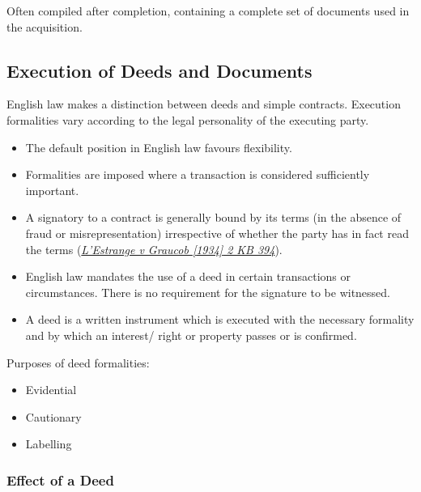 \documentclass[
]{article}
\providecommand{\tightlist}{%
  \setlength{\itemsep}{0pt}\setlength{\parskip}{0pt}}
\begin{document}
Often compiled after completion, containing a complete set of documents
used in the acquisition.

\hypertarget{execution-of-deeds-and-documents}{%
\subsection{Execution of Deeds and
Documents}\label{execution-of-deeds-and-documents}}

English law makes a distinction between deeds and simple contracts.
Execution formalities vary according to the legal personality of the
executing party.

\begin{itemize}
\tightlist
\item
  The default position in English law favours flexibility.
\item
  Formalities are imposed where a transaction is considered sufficiently
  important.
\item
  A signatory to a contract is generally bound by its terms (in the
  absence of fraud or misrepresentation) irrespective of whether the
  party has in fact read the terms
  (\emph{\href{https://uk.practicallaw.thomsonreuters.com/D-016-1583?originationContext=document\&transitionType=PLDocumentLink\&contextData=(sc.Default)\&ppcid=0e69ecc7bd0b425c8c07be4517611bac}{L'Estrange
  v Graucob {[}1934{]} 2 KB 394}}).
\item
  English law mandates the use of a deed in certain transactions or
  circumstances. There is no requirement for the signature to be
  witnessed.
\item
  A deed is a written instrument which is executed with the necessary
  formality and by which an interest/ right or property passes or is
  confirmed.
\end{itemize}

Purposes of deed formalities:

\begin{itemize}
\tightlist
\item
  Evidential
\item
  Cautionary
\item
  Labelling
\end{itemize}

\hypertarget{effect-of-a-deed}{%
\subsubsection{Effect of a Deed}\label{effect-of-a-deed}}
\end{document}
